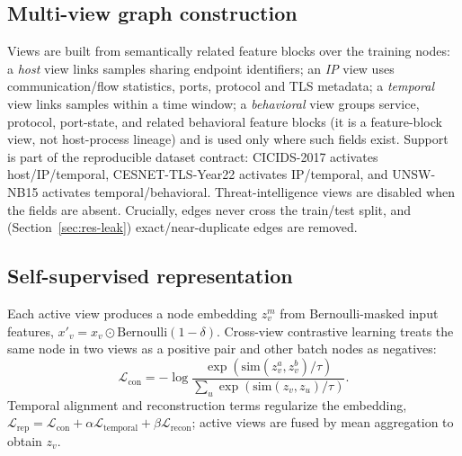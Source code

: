 \documentclass[pdflatex,referee,lineno,sn-basic,Numbered]{sn-jnl}
\begin{document}
\subsection{Multi-view graph construction}
Views are built from semantically related feature blocks over the training nodes:
a \emph{host} view links samples sharing endpoint identifiers; an \emph{IP} view
uses communication/flow statistics, ports, protocol and TLS metadata; a
\emph{temporal} view links samples within a time window; a \emph{behavioral} view
groups service, protocol, port-state, and related behavioral feature blocks
(it is a feature-block view, not host-process lineage) and is used only where such
fields exist. Support is part of the reproducible
dataset contract: CICIDS-2017 activates host/IP/temporal, CESNET-TLS-Year22
activates IP/temporal, and UNSW-NB15 activates temporal/behavioral. Threat-intelligence
views are disabled when the fields are absent. Crucially, edges never cross the
train/test split, and (Section~\ref{sec:res-leak}) exact/near-duplicate edges are
removed.

\subsection{Self-supervised representation}
Each active view produces a node embedding $z_v^{m}$ from Bernoulli-masked input
features, $x'_v = x_v \odot \mathrm{Bernoulli}(1-\delta)$. Cross-view contrastive
learning treats the same node in two views as a positive pair and other batch
nodes as negatives:
\begin{equation}
\mathcal{L}_{\text{con}} = -\log
\frac{\exp(\mathrm{sim}(z^{a}_v,z^{b}_v)/\tau)}
{\sum_{u}\exp(\mathrm{sim}(z_v,z_u)/\tau)} .
\end{equation}
Temporal alignment and reconstruction terms regularize the embedding,
$\mathcal{L}_{\text{rep}}=\mathcal{L}_{\text{con}}+\alpha\mathcal{L}_{\text{temporal}}
+\beta\mathcal{L}_{\text{recon}}$; active views are fused by mean aggregation to
obtain $z_v$.
\end{document}
